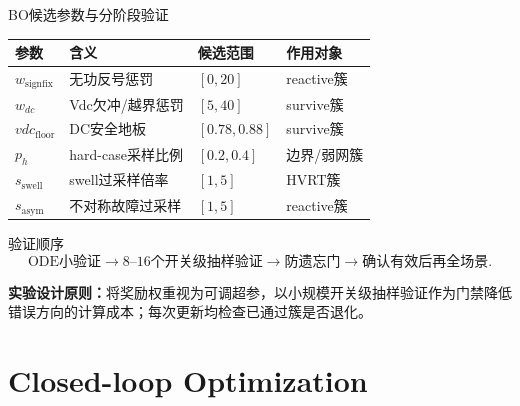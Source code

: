\documentclass[10pt,aspectratio=169,mathserif]{beamer}
\begin{document}
\begin{frame}{BO候选参数与分阶段验证}
\begin{table}
\centering\scriptsize
\begin{tabular}{llll}
\toprule
参数 & 含义 & 候选范围 & 作用对象 \\
\midrule
$w_{\mathrm{signfix}}$ & 无功反号惩罚 & $[0,20]$ & reactive簇 \\
$w_{dc}$ & Vdc欠冲/越界惩罚 & $[5,40]$ & survive簇 \\
$vdc_{\mathrm{floor}}$ & DC安全地板 & $[0.78,0.88]$ & survive簇 \\
$p_h$ & hard-case采样比例 & $[0.2,0.4]$ & 边界/弱网簇 \\
$s_{\mathrm{swell}}$ & swell过采样倍率 & $[1,5]$ & HVRT簇 \\
$s_{\mathrm{asym}}$ & 不对称故障过采样 & $[1,5]$ & reactive簇 \\
\bottomrule
\end{tabular}
\end{table}

\begin{block}{验证顺序}
\[
\text{ODE小验证}
\rightarrow
\text{8--16个开关级抽样验证}
\rightarrow
\text{防遗忘门}
\rightarrow
\text{确认有效后再全场景}.
\]
\end{block}

\medskip
\textbf{实验设计原则：}将奖励权重视为可调超参\cite{eimer_hpo}，以小规模开关级抽样验证作为门禁降低错误方向的计算成本；每次更新均检查已通过簇是否退化。
\end{frame}

\section{Closed-loop Optimization}
\end{document}
